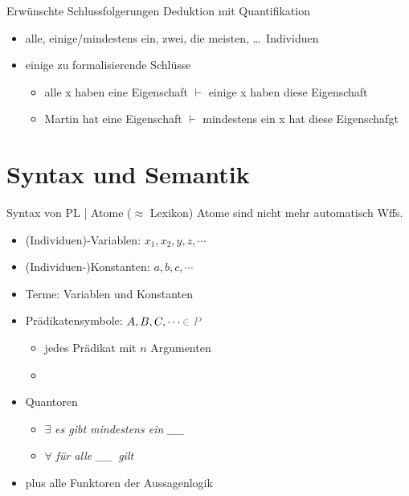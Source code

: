 \begin{frame}
  {Erwünschte Schlussfolgerungen}
  \onslide<+->
  \onslide<+->
  Deduktion mit Quantifikation\\
  \Halbzeile
  \begin{itemize}[<+->]
    \item alle, einige\slash mindestens ein, zwei, die meisten, \ldots\ Individuen
    \item einige zu formalisierende Schlüsse
      \begin{itemize}[<+->]
        \item \alert{alle x} haben eine Eigenschaft $\vdash$ \alert{einige x} haben diese Eigenschaft
        \item \alert{Martin} hat eine Eigenschaft $\vdash$ \alert{mindestens ein x} hat diese Eigenschafgt
      \end{itemize}
  \end{itemize}
\end{frame}

\section{Syntax und Semantik}

\begin{frame}
  {Syntax von PL | Atome ($\approx$ Lexikon)}
  \onslide<+->
  \onslide<+->
  Atome sind nicht mehr automatisch Wffs.\\
  \Halbzeile
  \begin{itemize}[<+->]
    \item \alert{(Individuen)-Variablen}: $x_1, x_2, y, z, \cdots$ 
    \item \alert{(Individuen-)Konstanten}: $a, b, c, \cdots$ 
    \item \alert{Terme}: Variablen und Konstanten 
    \item \alert{Prädikatensymbole}: $A, B, C, \cdots \grau{\in P}$
      \begin{itemize}[<+->]
        \item jedes Prädikat mit $n$ Argumenten 
        \item {}
      \end{itemize}
    \item \alert{Quantoren}
      \begin{itemize}[<+->]
        \item $\exists$ \textit{es gibt mindestens ein \_\_}
        \item $\forall$ \textit{für alle \_\_\ gilt}
      \end{itemize}
    \item plus alle \alert{Funktoren} der Aussagenlogik
  \end{itemize}
\end{frame}

